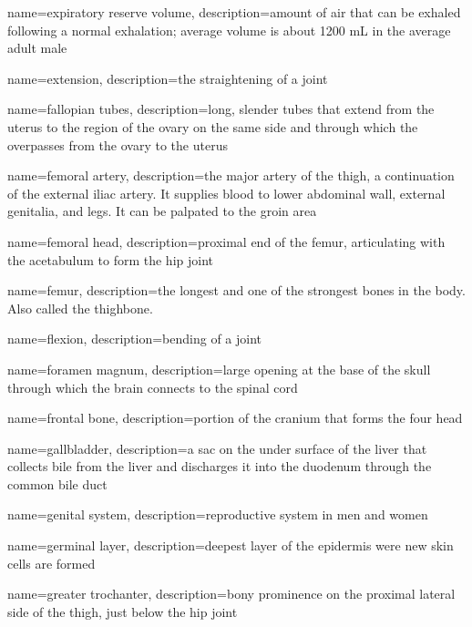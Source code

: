 \documentclass[../../EMT-169.tex]{subfiles}
\begin{document}
	{
		name=expiratory reserve volume,
		description={amount of air that can be exhaled following a normal exhalation; average volume is about 1200 mL in the average adult male}
	}
	
	{
		name=extension,
		description={the straightening of a joint}
	}

	{
		name=fallopian tubes,
		description={long, slender tubes that extend from the uterus to the region of the ovary on the same side and through which the overpasses from the ovary to the uterus}
	}
	
	{
		name=femoral artery,
		description={the major artery of the thigh, a continuation of the external iliac artery. It supplies blood to lower abdominal wall, external genitalia, and legs. It can be palpated to the groin area}
	}
	
	{
		name=femoral head,
		description={proximal end of the femur, articulating with the acetabulum to form the hip joint}
	}
	
	{
		name=femur,
		description={the longest and one of the strongest bones in the body.  Also called the thighbone.}
	}
	
	{
		name=flexion,
		description={bending of a joint}
	}
	
	{
		name=foramen magnum,
		description={large opening at the base of the skull through which the brain connects to the spinal cord}
	}
	
	{
		name=frontal bone,
		description={portion of the cranium that forms the four head}
	}

	{
		name=gallbladder,
		description={a sac on the under surface of the liver that collects bile from the liver and discharges it into the duodenum through the common bile duct}
	}
	
	{
		name=genital system,
		description={reproductive system in men and women}
	}
	
	{
		name=germinal layer,
		description={deepest layer of the epidermis were new skin cells are formed}
	}
	
	{
		name=greater trochanter,
		description={bony prominence on the proximal lateral side of the thigh, just below the hip joint}
	}
	
\end{document}
